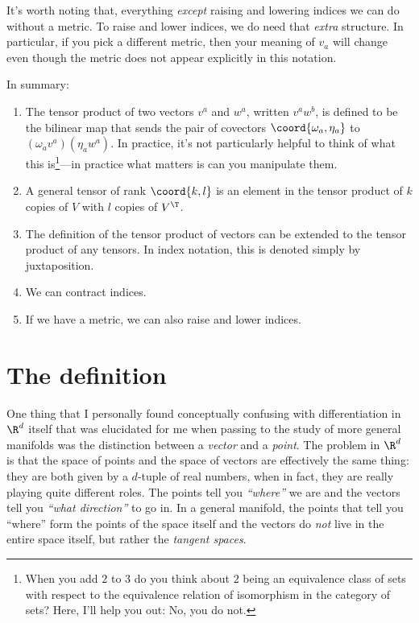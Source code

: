 It's worth noting that, everything \emph{except} raising and lowering indices we can do without a metric.  To raise and lower indices, we do need that \emph{extra} structure.  In particular, if you pick a different metric, then your meaning of $v_a$ will change even though the metric does not appear explicitly in this notation.

In summary:
\begin{enumerate}
\item The tensor product of two vectors $v^a$ and $w^a$, written $v^aw^b$, is defined to be the bilinear map that sends the pair of covectors $\coord{\omega _a,\eta _a}$ to $(\omega _av^a)(\eta _aw^a)$.  In practice, it's not particularly helpful to think of what this is\footnote{When you add $2$ to $3$ do you think about $2$ being an equivalence class of sets with respect to the equivalence relation of isomorphism in the category of sets?  Here, I'll help you out:  No, you do not.}---in practice what matters is can you manipulate them.
\item A general tensor of rank $\coord{k,l}$ is an element in the tensor product of $k$ copies of $V$ with $l$ copies of $V^{\T}$.
\item The definition of the tensor product of vectors can be extended to the tensor product of any tensors.  In index notation, this is denoted simply by juxtaposition.
\item We can contract indices.
\item If we have a metric, we can also raise and lower indices.
\end{enumerate}

\section{The definition}

One thing that I personally found conceptually confusing with differentiation in $\R ^d$ itself that was elucidated for me when passing to the study of more general manifolds was the distinction between a \emph{vector} and a \emph{point}.  The problem in $\R ^d$ is that the space of points and the space of vectors are effectively the same thing:  they are both given by a $d$-tuple of real numbers, when in fact, they are really playing quite different roles.  The points tell you \emph{``where''} we are and the vectors tell you \emph{``what direction''} to go in.  In a general manifold, the points that tell you ``where'' form the points of the space itself and the vectors do \emph{not} live in the entire space itself, but rather the \emph{tangent spaces}.

